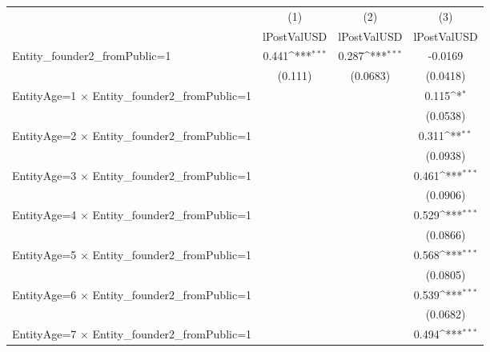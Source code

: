 {
\def\sym#1{\ifmmode^{#1}\else\(^{#1}\)\fi}
\begin{tabular}{l*{3}{c}}
\hline\hline
                    &\multicolumn{1}{c}{(1)}&\multicolumn{1}{c}{(2)}&\multicolumn{1}{c}{(3)}\\
                    &\multicolumn{1}{c}{lPostValUSD}&\multicolumn{1}{c}{lPostValUSD}&\multicolumn{1}{c}{lPostValUSD}\\
\hline
Entity\_founder2\_fromPublic=1&       0.441\sym{***}&       0.287\sym{***}&     -0.0169         \\
                    &     (0.111)         &    (0.0683)         &    (0.0418)         \\
[1em]
EntityAge=1 $\times$ Entity\_founder2\_fromPublic=1&                     &                     &       0.115\sym{*}  \\
                    &                     &                     &    (0.0538)         \\
[1em]
EntityAge=2 $\times$ Entity\_founder2\_fromPublic=1&                     &                     &       0.311\sym{**} \\
                    &                     &                     &    (0.0938)         \\
[1em]
EntityAge=3 $\times$ Entity\_founder2\_fromPublic=1&                     &                     &       0.461\sym{***}\\
                    &                     &                     &    (0.0906)         \\
[1em]
EntityAge=4 $\times$ Entity\_founder2\_fromPublic=1&                     &                     &       0.529\sym{***}\\
                    &                     &                     &    (0.0866)         \\
[1em]
EntityAge=5 $\times$ Entity\_founder2\_fromPublic=1&                     &                     &       0.568\sym{***}\\
                    &                     &                     &    (0.0805)         \\
[1em]
EntityAge=6 $\times$ Entity\_founder2\_fromPublic=1&                     &                     &       0.539\sym{***}\\
                    &                     &                     &    (0.0682)         \\
[1em]
EntityAge=7 $\times$ Entity\_founder2\_fromPublic=1&                     &                     &       0.494\sym{***}\\

\end{tabular}}
